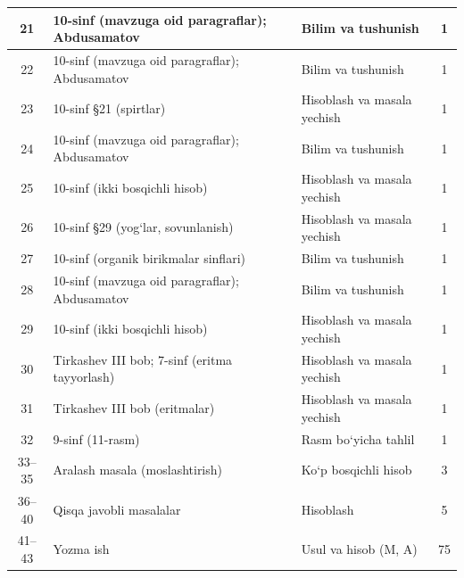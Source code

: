 \documentclass[11pt,a4paper]{article}
\begin{document}
{\begin{longtable}{|c|p{7.2cm}|p{5.4cm}|c|}
21 & 10-sinf (mavzuga oid paragraflar); Abdusamatov & Bilim va tushunish & 1\\\hline
22 & 10-sinf (mavzuga oid paragraflar); Abdusamatov & Bilim va tushunish & 1\\\hline
23 & 10-sinf \S{}21 (spirtlar) & Hisoblash va masala yechish & 1\\\hline
24 & 10-sinf (mavzuga oid paragraflar); Abdusamatov & Bilim va tushunish & 1\\\hline
25 & 10-sinf (ikki bosqichli hisob) & Hisoblash va masala yechish & 1\\\hline
26 & 10-sinf \S{}29 (yog`lar, sovunlanish) & Hisoblash va masala yechish & 1\\\hline
27 & 10-sinf (organik birikmalar sinflari) & Bilim va tushunish & 1\\\hline
28 & 10-sinf (mavzuga oid paragraflar); Abdusamatov & Bilim va tushunish & 1\\\hline
29 & 10-sinf (ikki bosqichli hisob) & Hisoblash va masala yechish & 1\\\hline
30 & Tirkashev III bob; 7-sinf (eritma tayyorlash) & Hisoblash va masala yechish & 1\\\hline
31 & Tirkashev III bob (eritmalar) & Hisoblash va masala yechish & 1\\\hline
32 & 9-sinf (11-rasm) & Rasm bo`yicha tahlil & 1\\\hline
33--35 & Aralash masala (moslashtirish) & Ko`p bosqichli hisob & 3\\\hline
36--40 & Qisqa javobli masalalar & Hisoblash & 5\\\hline
41--43 & Yozma ish & Usul va hisob (M, A) & 75\\\hline
\end{longtable}}
\end{document}
